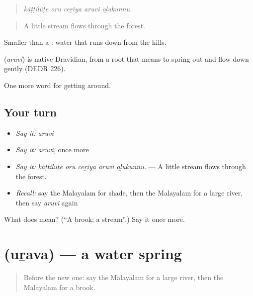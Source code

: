 \begin{quote}
\emph{kāṭṭilūṭe oru ceṟiya aruvi oḻukunnu.}
\end{quote}

\begin{quote}
A little stream flows through the forest.
\end{quote}

Smaller than a : water that runs down from the hills.

\begin{cousinweb}
\textbf{} (\emph{aruvi}) is native Dravidian, from a root that means to spring out and flow down gently (DEDR 226).
\end{cousinweb}

\begin{grammarlens}[title={What you've built}]
One more word for getting around.
\end{grammarlens}

\subsection*{Your turn}
\begin{itemize}
\raggedright
  \item \emph{Say it:} \emph{aruvi}
  \item \emph{Say it:} \emph{aruvi}, once more
  \item \emph{Say it:} \emph{kāṭṭilūṭe oru ceṟiya aruvi oḻukunnu.} — A little stream flows through the forest.
  \item \emph{Recall:} say the Malayalam for shade, then the Malayalam for a large river, then say \emph{aruvi} again
\end{itemize}

\begin{tcolorbox}[breakable,colback=teal!4,colframe=teal!35!black,title={Before you move on}]
What does  mean? (\textquotedblleft{}A brook; a stream\textquotedblright{}.) Say it once more.
\end{tcolorbox}
\section[\texorpdfstring{\ml{ഉറവ} (uṟava)}{ഉറവ (uṟava)}]{ (uṟava) — a water spring}

\label{lesson:ML-C496-urava}



\begin{quote}
Before the new one: say the Malayalam for a large river, then the Malayalam for a brook.
\end{quote}

